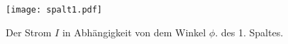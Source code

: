 
\begin{figure}
  \centering
  \texttt{[image: spalt1.pdf]}
  \caption{ Der Strom $I$ in Abhängigkeit von dem Winkel $\phi$. des 1. Spaltes.}
  \label{fig:spalt1}
\end{figure}
\FloatBarrier

